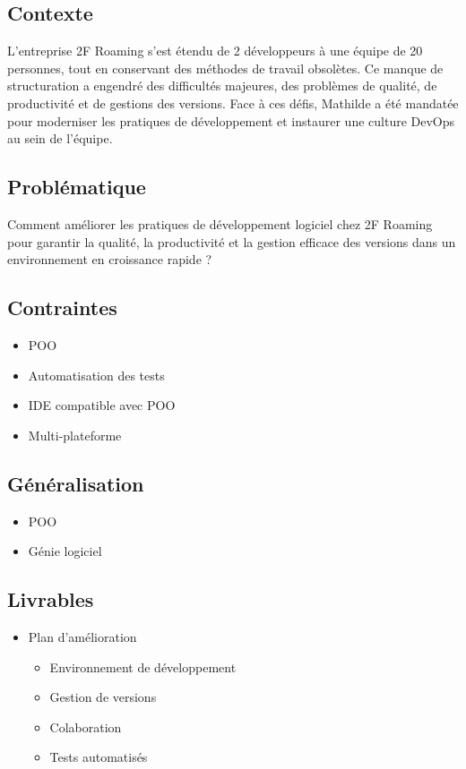 \subsection*{Contexte}
{}
\noindent L'entreprise 2F Roaming s'est étendu de 2 développeurs à une équipe de 20 personnes, tout en conservant des méthodes de travail obsolètes. Ce manque de structuration a engendré des difficultés majeures, des problèmes de qualité, de productivité et de gestions des versions. Face à ces défis, Mathilde a été mandatée pour moderniser les pratiques de développement et instaurer une culture DevOps au sein de l'équipe.

\subsection*{Problématique}
{}
\noindent Comment améliorer les pratiques de développement logiciel chez 2F Roaming pour garantir la qualité, la productivité et la gestion efficace des versions dans un environnement en croissance rapide ?

\subsection*{Contraintes}
{}
\begin{itemize}
	\item POO
	\item Automatisation des tests
	\item IDE compatible avec POO
	\item Multi-plateforme
\end{itemize}

\subsection*{Généralisation}
{}
\begin{itemize}
	\item POO
	\item Génie logiciel
\end{itemize}

\subsection*{Livrables}
{}
\begin{itemize}
	\item Plan d'amélioration
	\begin{itemize}
		\item Environnement de développement
		\item Gestion de versions
		\item Colaboration
		\item Tests automatisés
	\end{itemize}
\end{itemize}

